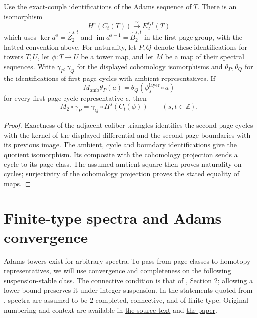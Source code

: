 \begin{theorem}
\label{sem:AdamsSynthetic:coefficient-tower-e2-cohomology}
Use the exact-couple identifications of the Adams sequence of $T$.
There is an isomorphism
\[
  H^s(C_t(T))\xrightarrow{\sim}E_2^{s,t}(T)
\]
which uses $\ker d^s=\widehat Z_2^{s,t}$ and
$\operatorname{im}d^{s-1}=\widehat B_2^{s,t}$ in the first-page group,
with the hatted convention above.
For naturality, let $P,Q$ denote these identifications for towers $T,U$,
let $\phi:T\to U$ be a tower map, and let $M$ be a map of their
spectral sequences. Write $\gamma_P,\gamma_Q$ for the displayed
cohomology isomorphisms and $\theta_P,\theta_Q$ for the identifications
of first-page cycles with ambient representatives. If
\[
 M_{\mathrm{amb}}\theta_P(a)
   =\theta_Q(\phi_s^{\mathrm{layer}}\circ a)
\]
for every first-page cycle representative $a$, then
\[
 M_2\circ\gamma_P=\gamma_Q\circ H^s(C_t(\phi))
 \qquad(s,t\in\mathbb Z).
\]
\end{theorem}
\begin{proof}
Exactness of the adjacent cofiber triangles identifies the second-page
cycles with the kernel of the displayed differential and the second-page
boundaries with its previous image. The ambient, cycle and boundary identifications give the quotient
isomorphism. Its composite with the cohomology projection sends a cycle
to its page class. The assumed ambient square then
proves naturality on cycles; surjectivity of the cohomology projection proves
the stated equality of maps.
\end{proof}

\section{Finite-type spectra and Adams convergence}

Adams towers exist for arbitrary spectra. To pass from page classes to
homotopy representatives, we will use convergence and completeness on
the following suspension-stable class. The connective condition is that
of \cite{LWX126}, Section 2; allowing a lower bound preserves it under
integer suspension. In the statements quoted from \cite{LWX126},
spectra are assumed to be $2$-completed, connective, and of finite type.
Original numbering and context are available in
\href{paper/main.tex.html}{the source text} and
\href{paper/2412.10879.pdf}{the paper}.

